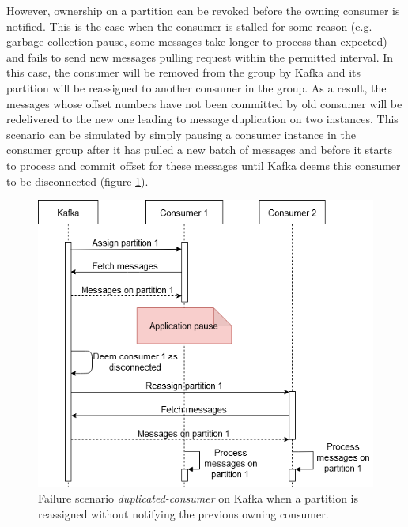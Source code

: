 However, ownership on a partition can be revoked before the owning consumer is notified. This is the case when the consumer is stalled for some reason (e.g. garbage collection pause, some messages take longer to process than expected) and fails to send new messages pulling request within the permitted interval. In this case, the consumer will be removed from the group by Kafka and its partition will be reassigned to another consumer in the group. As a result, the messages whose offset numbers have not been committed by old consumer will be redelivered to the new one leading to message duplication on two instances. This scenario can be simulated by simply pausing a consumer instance in the consumer group after it has pulled a new batch of messages and before it starts to process and commit offset for these messages until Kafka deems this consumer to be disconnected (figure \ref{fig:kafkascenario}). 
\newpage
\begin{figure}[h]
	\centering
	\includegraphics[width=12cm]{images/kafka-duplicated-scenario.png}
	\caption{Failure scenario \emph{duplicated-consumer} on Kafka when a partition is reassigned without notifying the previous owning consumer.}
	\label{fig:kafkascenario}
\end{figure}

\iffalse

